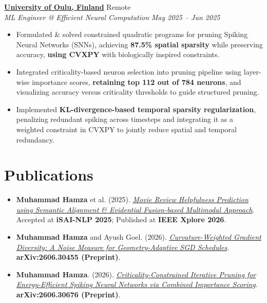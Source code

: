 \documentclass[10.5pt, a4paper]{article}
\newcommand{\resumeItem}[1]{\item[\textbullet] #1}
\newcommand{\expEntry}[4]{%
    \hspace*{-16pt}%
    \textbf{#1} \hfill #2 \\
    \hspace*{-12pt}%
    \textit{#3} \hfill \textit{#4} \\[-4pt]
    \vspace{-6pt}
}
\begin{document}
\expEntry
    {\href{https://github.com/Hamza-Faarooq/Pruning-with-SNNs}{University of Oulu, Finland}}{Remote}
    {ML Engineer @ Efficient Neural Computation}{May 2025 -- Jun 2025}
        \vspace{-4pt}

\begin{itemize}[leftmargin=-1pt, itemsep=1pt, topsep=-2pt, parsep=0pt]
\resumeItem{Formulated \& solved constrained quadratic programs for pruning Spiking Neural Networks (SNNs), achieving \textbf{87.5\% spatial sparsity} while preserving accuracy, \textbf{using CVXPY} with biologically inspired constraints.}
\resumeItem{Integrated criticality-based neuron selection into pruning pipeline using layer-wise importance scores, \textbf{retaining top 112 out of 784 neurons}, and visualizing accuracy versus criticality thresholds to guide structured pruning.}
    \resumeItem{Implemented \textbf{KL-divergence-based temporal sparsity regularization}, penalizing redundant spiking across timesteps and integrating it as a weighted constraint in CVXPY to jointly reduce spatial and temporal redundancy.}
\end{itemize}

    \vspace{-1pt}


\section{Publications}

\begin{itemize}[leftmargin=-1pt, itemsep=2pt, topsep=-2pt, parsep=0pt]
\vspace{2pt}
    \resumeItem{\textbf{Muhammad Hamza} et al. (2025).
    \href{https://ieeexplore.ieee.org/abstract/document/11492803}{\textit{Movie Review Helpfulness Prediction using Semantic Alignment \& Evidential Fusion-based Multimodal Approach}}.
    Accepted at \textbf{iSAI-NLP 2025}; Published at \textbf{IEEE Xplore 2026}.}

    \resumeItem{\textbf{Muhammad Hamza} and Ayush Goel. (2026).
    \href{https://arxiv.org/abs/2606.30455}{\textit{Curvature-Weighted Gradient Diversity: A Noise Measure for Geometry-Adaptive SGD Schedules}}.
    \textbf{arXiv:2606.30455 (Preprint)}.}

    \resumeItem{\textbf{Muhammad Hamza}. (2026).
    \href{https://arxiv.org/abs/2606.30676}{\textit{Criticality-Constrained Iterative Pruning for Energy-Efficient Spiking Neural Networks via Combined Importance Scoring}}.
    \textbf{arXiv:2606.30676 (Preprint)}.}

\end{itemize}
    \vspace{-1pt}
\end{document}
